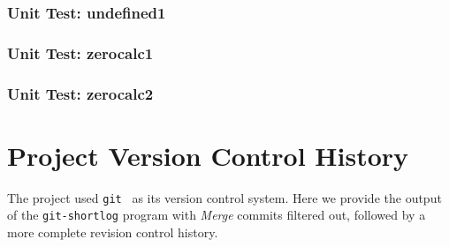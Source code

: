 \subsection*{Unit Test: undefined1}

 \clearpage
\subsection*{Unit Test: zerocalc1}

 \clearpage
\subsection*{Unit Test: zerocalc2}

 \clearpage

\chapter{Project Version Control History}
\label{chap:vcshistory}
The \sys{} project used \texttt{git}~\cite{git:website} as its version control system.
Here we provide the output of the \texttt{git-shortlog} program with \emph{Merge}
commits filtered out, followed by a more complete revision control history.


